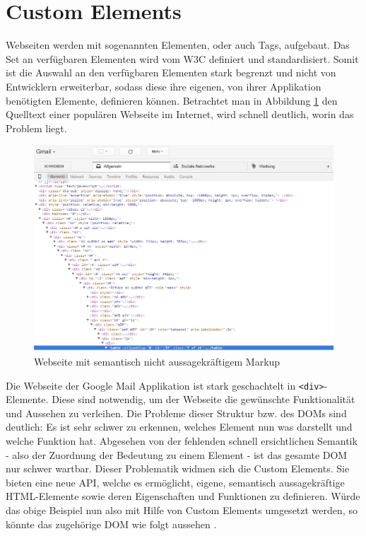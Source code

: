 \section{Custom Elements}\label{custom-elements}

Webseiten werden mit sogenannten Elementen, oder auch Tags, aufgebaut. Das Set an verfügbaren Elementen wird vom W3C definiert und standardisiert. Somit ist die Auswahl an den verfügbaren Elementen stark begrenzt und nicht von Entwicklern erweiterbar, sodass diese ihre eigenen, von ihrer Applikation benötigten Elemente, definieren können. Betrachtet man in Abbildung \ref{fig:cusel} den Quelltext einer populären Webseite im Internet, wird schnell deutlich, worin das Problem liegt.

\begin{figure}[htbp]
 \centering
 \includegraphics[width=\linewidth]{kapitel2/bilder/2-custom-elements-div-suppe}
 \caption{Webseite mit semantisch nicht aussagekräftigem Markup}
 \label{fig:cusel}
\end{figure}

Die Webseite der Google Mail Applikation ist stark geschachtelt in \texttt{\textless{}div\textgreater{}}-Elemente. Diese sind notwendig, um der Webseite die gewünschte Funktionalität und Aussehen zu verleihen. Die Probleme dieser Struktur bzw. des DOMs sind deutlich: Es ist sehr schwer zu erkennen, welches Element nun was darstellt und welche Funktion hat. Abgesehen von der fehlenden schnell ersichtlichen Semantik - also der Zuordnung der Bedeutung zu einem Element - ist das gesamte DOM nur schwer wartbar.
Dieser Problematik widmen sich die Custom Elements. Sie bieten eine neue API, welche es ermöglicht, eigene, semantisch aussagekräftige HTML-Elemente sowie deren Eigenschaften und Funktionen zu definieren. Würde das obige Beispiel nun also mit Hilfe von Custom Elements umgesetzt werden, so könnte das zugehörige DOM wie folgt aussehen \cite{citeulike:13844982}.

